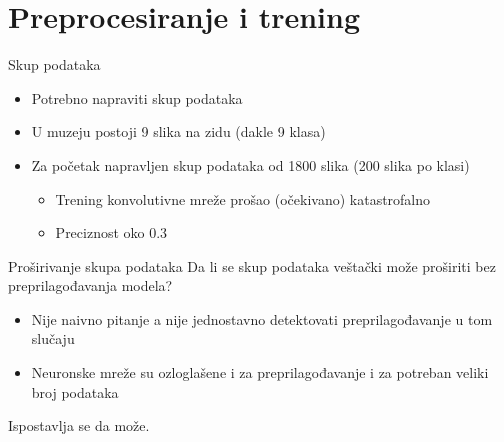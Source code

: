 \documentclass{beamer}
\begin{document}
\section{Preprocesiranje i trening}
\begin{frame}{Skup podataka}
    \begin{itemize}
        \item Potrebno napraviti skup podataka
        \item U muzeju postoji 9 slika na zidu (dakle 9 klasa)
        \item Za početak napravljen skup podataka od 1800 slika (200 slika po klasi)
        \begin{itemize}
            \item Trening konvolutivne mreže prošao (očekivano) katastrofalno
            \item Preciznost oko 0.3
        \end{itemize}
    \end{itemize} 
\end{frame}
\begin{frame}{Proširivanje skupa podataka}
    Da li se skup podataka veštački može proširiti bez preprilagođavanja modela?
    \begin{itemize}
        \item Nije naivno pitanje a nije jednostavno detektovati preprilagođavanje u tom slučaju
        \item Neuronske mreže su ozloglašene i za preprilagođavanje i za potreban veliki broj podataka
    \end{itemize}

    Ispostavlja se da može.
\end{frame}
\end{document}
